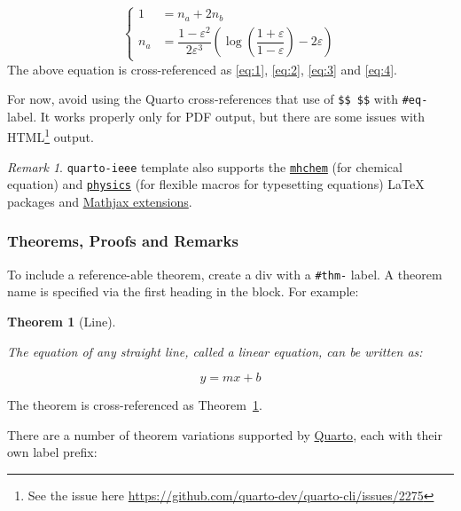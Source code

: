 \documentclass[
  journal,
]{IEEEtran}%
\theoremstyle{plain}
\newtheorem{theorem}{Theorem}[section]
\theoremstyle{remark}
\newtheorem*{remark}{Remark}
\begin{document}
\begin{equation}\label{eq:4}
\begin{cases}
    1&=n_a+2n_b \\
    n_a&=\dfrac{1-{\varepsilon}^2}{2{\varepsilon}^3}\left(\log\left(\dfrac{1+{\varepsilon}}{1-{\varepsilon}}\right)-2{\varepsilon}\right)
\end{cases}
\end{equation} The above equation is cross-referenced as \eqref{eq:1},
\eqref{eq:2}, \eqref{eq:3} and \eqref{eq:4}.

For now, avoid using the Quarto cross-references that use of
\texttt{\$\$\ \$\$} with \texttt{\#eq-} label. It works properly only
for PDF output, but there are some issues with HTML\footnote{See the
  issue here \url{https://github.com/quarto-dev/quarto-cli/issues/2275}}
output.

\begin{remark}

\texttt{quarto-ieee} template also supports the
\href{https://ctan.org/pkg/mhchem}{\texttt{mhchem}} (for chemical
equation) and \href{https://ctan.org/pkg/physics}{\texttt{physics}} (for
flexible macros for typesetting equations) {\LaTeX} packages and
\href{https://docs.mathjax.org/en/latest/input/tex/extensions/index.html}{Mathjax
extensions}.

\end{remark}

\hypertarget{theorems-proofs-and-remarks}{%
\subsubsection{Theorems, Proofs and
Remarks}\label{theorems-proofs-and-remarks}}

To include a reference-able theorem, create a div with a \texttt{\#thm-}
label. A theorem name is specified via the first heading in the block.
For example:

\begin{theorem}[Line]\protect\hypertarget{thm-line}{}\label{thm-line}

The equation of any straight line, called a linear equation, can be
written as:

\[
y = mx + b
\]

\end{theorem}

The theorem is cross-referenced as Theorem~\ref{thm-line}.

There are a number of theorem variations supported by
\href{https://quarto.org/docs/authoring/cross-references.html\#theorems-and-proofs}{Quarto},
each with their own label prefix:
\end{document}
